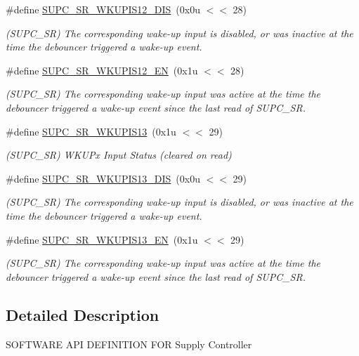 \begin{DoxyCompactItemize}
\#define \mbox{\hyperlink{group__SAMS70__SUPC_ga8d50ae6062fac5694ae093e8dfc63894}{S\+U\+P\+C\+\_\+\+S\+R\+\_\+\+W\+K\+U\+P\+I\+S12\+\_\+\+D\+IS}}~(0x0u $<$$<$ 28)
\begin{DoxyCompactList}\small\item\em (S\+U\+P\+C\+\_\+\+SR) The corresponding wake-\/up input is disabled, or was inactive at the time the debouncer triggered a wake-\/up event. \end{DoxyCompactList}\item 
\mbox{\label{group__SAMS70__SUPC_ga88926dd1474bacfe6d4f9d31a5ecd487}} 
\#define \mbox{\hyperlink{group__SAMS70__SUPC_ga88926dd1474bacfe6d4f9d31a5ecd487}{S\+U\+P\+C\+\_\+\+S\+R\+\_\+\+W\+K\+U\+P\+I\+S12\+\_\+\+EN}}~(0x1u $<$$<$ 28)
\begin{DoxyCompactList}\small\item\em (S\+U\+P\+C\+\_\+\+SR) The corresponding wake-\/up input was active at the time the debouncer triggered a wake-\/up event since the last read of S\+U\+P\+C\+\_\+\+SR. \end{DoxyCompactList}\item 
\mbox{\label{group__SAMS70__SUPC_gac72338e58315c3ef88f7a9328533328e}} 
\#define \mbox{\hyperlink{group__SAMS70__SUPC_gac72338e58315c3ef88f7a9328533328e}{S\+U\+P\+C\+\_\+\+S\+R\+\_\+\+W\+K\+U\+P\+I\+S13}}~(0x1u $<$$<$ 29)
\begin{DoxyCompactList}\small\item\em (S\+U\+P\+C\+\_\+\+SR) W\+K\+U\+Px Input Status (cleared on read) \end{DoxyCompactList}\item 
\mbox{\label{group__SAMS70__SUPC_gaba99fb2dc63dc1fcd2c4a421437a0fbc}} 
\#define \mbox{\hyperlink{group__SAMS70__SUPC_gaba99fb2dc63dc1fcd2c4a421437a0fbc}{S\+U\+P\+C\+\_\+\+S\+R\+\_\+\+W\+K\+U\+P\+I\+S13\+\_\+\+D\+IS}}~(0x0u $<$$<$ 29)
\begin{DoxyCompactList}\small\item\em (S\+U\+P\+C\+\_\+\+SR) The corresponding wake-\/up input is disabled, or was inactive at the time the debouncer triggered a wake-\/up event. \end{DoxyCompactList}\item 
\mbox{\label{group__SAMS70__SUPC_gaec34ff09f82b720754bd86d17b184972}} 
\#define \mbox{\hyperlink{group__SAMS70__SUPC_gaec34ff09f82b720754bd86d17b184972}{S\+U\+P\+C\+\_\+\+S\+R\+\_\+\+W\+K\+U\+P\+I\+S13\+\_\+\+EN}}~(0x1u $<$$<$ 29)
\begin{DoxyCompactList}\small\item\em (S\+U\+P\+C\+\_\+\+SR) The corresponding wake-\/up input was active at the time the debouncer triggered a wake-\/up event since the last read of S\+U\+P\+C\+\_\+\+SR. \end{DoxyCompactList}\end{DoxyCompactItemize}


\subsection{Detailed Description}
S\+O\+F\+T\+W\+A\+RE A\+PI D\+E\+F\+I\+N\+I\+T\+I\+ON F\+OR Supply Controller 